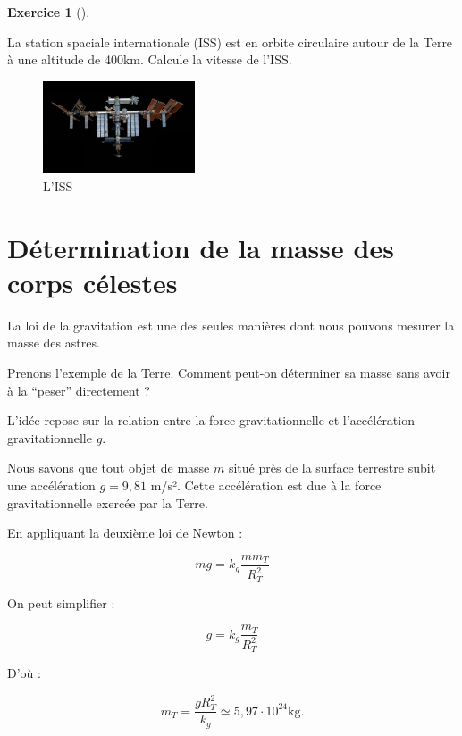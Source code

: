 \documentclass[
  letterpaper,
  DIV=11,
  numbers=noendperiod]{scrartcl}
\theoremstyle{definition}
\newtheorem{exercise}{Exercice}[section]
\theoremstyle{definition}
\theoremstyle{definition}
\theoremstyle{remark}
\begin{document}
\begin{exercise}[]\protect\hypertarget{exr-iss}{}\label{exr-iss}

La station spaciale internationale (ISS) est en orbite circulaire autour
de la Terre à une altitude de 400km. Calcule la vitesse de l'ISS.

\end{exercise}

\begin{figure}[H]

{\centering \includegraphics[width=0.4\textwidth,height=\textheight]{figures/grav/iss.pdf}

}

\caption{L'ISS}

\end{figure}%

\section{Détermination de la masse des corps
célestes}\label{duxe9termination-de-la-masse-des-corps-cuxe9lestes}

La loi de la gravitation est une des seules manières dont nous pouvons
mesurer la masse des astres.

Prenons l'exemple de la Terre. Comment peut-on déterminer sa masse sans
avoir à la ``peser'' directement ?

L'idée repose sur la relation entre la force gravitationnelle et
l'accélération gravitationnelle \(g\).

Nous savons que tout objet de masse \(m\) situé près de la surface
terrestre subit une accélération \(g = 9,81\) m/s². Cette accélération
est due à la force gravitationnelle exercée par la Terre.

En appliquant la deuxième loi de Newton :

\[
m g =  k_g\frac{m m_T}{R_T^2}
\]

On peut simplifier :

\[
g = k_g\frac{ m_T}{R_T^2}
\]

D'où :

\[
m_T = \frac{g R_T^2}{k_g}\simeq 5,97\cdot 10^{24}\text{kg}.
\]
\end{document}
